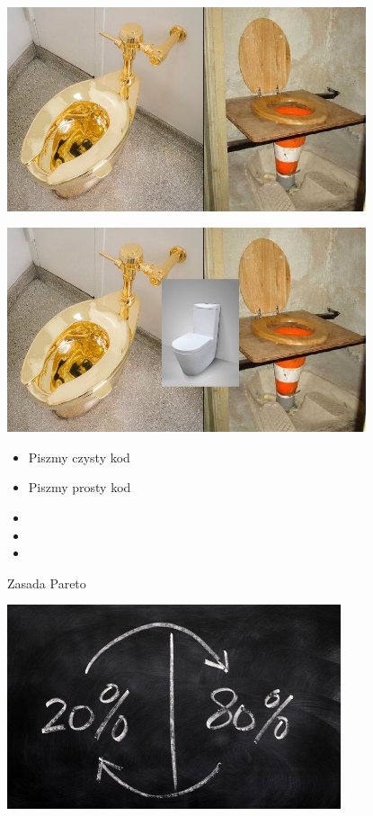 \documentclass{beamer}
\begin{document}
\begin{frame}{}
\begin{center}
  	\includegraphics[height=6cm]{prosty_kod1.jpg}
\end{center}
\end{frame}

\begin{frame}{}
\begin{center}
  	\includegraphics[height=6cm]{prosty_kod2.jpg}
\end{center}
\end{frame}

\begin{frame}{}
     \begin{Large}
	\begin{itemize}
		\item Piszmy czysty kod
		\item Piszmy prosty kod
		\item 
		\item 
		\item 
	\end{itemize}
     \end{Large}
\end{frame}

\begin{frame}{Zasada Pareto}
\begin{center}
  	\includegraphics[height=6cm]{pareto.jpg}
\end{center}
\end{frame}
\end{document}
